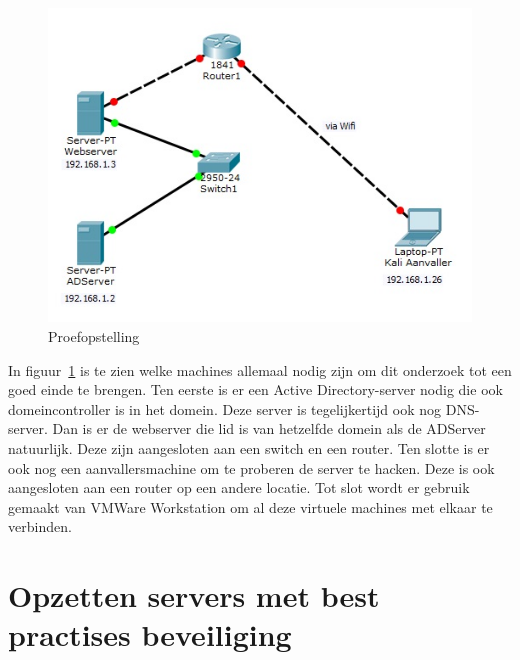 \documentclass[pdftex,a4paper,12pt]{report}
\begin{document}
\begin{figure}[H]
\begin{center}
\includegraphics{img/Situatie}
\end{center}
\caption{Proefopstelling}
\label{img:situatie}
\end{figure}

In figuur~\ref{img:situatie} is te zien welke machines allemaal nodig zijn om dit onderzoek tot een goed einde te brengen. Ten eerste is er een Active Directory-server nodig die ook domeincontroller is in het domein. Deze server is tegelijkertijd ook nog DNS-server. Dan is er de webserver die lid is van hetzelfde domein als de ADServer natuurlijk. Deze zijn aangesloten aan een switch en een router. Ten slotte is er ook nog een aanvallersmachine om te proberen de server te hacken. Deze is ook aangesloten aan een router op een andere locatie. Tot slot wordt er gebruik gemaakt van VMWare Workstation om al deze virtuele machines met elkaar te verbinden.

\chapter{Opzetten servers met best practises beveiliging}
\end{document}
